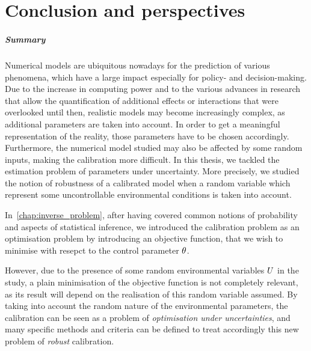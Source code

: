 \documentclass[../../Main_ManuscritThese.tex]{subfiles}
\begin{document}
\pagestyle{conclusionStyle}



\TitleBtwLines
\chapter*{Conclusion and perspectives}
{}
\label{chap:Conclusion}
\renewcommand{\thesection}{} %

\paragraph{Summary}

Numerical models are ubiquitous nowadays for the prediction of various
phenomena, which have a large impact especially for policy- and
decision-making.  Due to the increase in computing power and to the
various advances in research that allow the quantification of
additional effects or interactions that were overlooked until then,
realistic models may become increasingly complex, as additional
parameters are taken into account. In order to get a meaningful
representation of the reality, those parameters have to be chosen
accordingly. Furthermore, the numerical model studied may also be
affected by some random inputs, making the calibration more
difficult. In this thesis, we tackled the estimation problem of
parameters under uncertainty. More precisely, we studied the notion of
robustness of a calibrated model when a random variable which
represent some uncontrollable environmental conditions is taken into
account.


In~\cref{chap:inverse_problem}, after having covered common notions
of probability and aspects of statistical inference, we introduced
the calibration problem as an optimisation problem by introducing an
objective function, that we wish to minimise with resepct to the
control parameter $\theta$.

However, due to the presence of some random environmental variables
$U$ in the study, a plain minimisation of the objective function is
not completely relevant, as its result will depend on the realisation of this
random variable assumed.  By
taking into account the random nature of the {environmental
  parameters}, the calibration can be seen as a problem of
\emph{optimisation under uncertainties}, and many specific methods and
criteria can be defined to treat accordingly this new problem of
\emph{robust} calibration.
\end{document}
